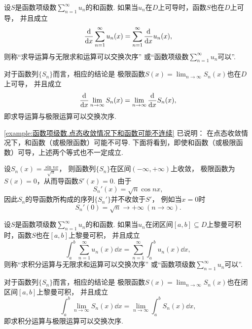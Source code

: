 \begin{definition}
设\(S\)是函数项级数\(\sum_{n=1}^\infty u_n\)的和函数.
如果当\(u_n\)在\(D\)上可导时，函数\(S\)也在\(D\)上可导，
并且成立\begin{equation*}
	\dv{x} \sum_{n=1}^\infty u_n(x)
	= \sum_{n=1}^\infty \dv{x} u_n(x),
\end{equation*}
则称“求导运算与无限求和运算可以交换次序”
或“函数项级数\(\sum_{n=1}^\infty u_n\)可以”.
\end{definition}
对于函数列\(\{S_n\}\)而言，相应的结论是
极限函数\(S(x) = \lim_{n\to\infty} S_n(x)\)也在\(D\)上可导，
并且成立\begin{equation*}
	\dv{x} \lim_{n\to\infty} S_n(x)
	= \lim_{n\to\infty} \dv{x} S_n(x),
\end{equation*}
即求导运算与极限运算可以交换次序.

\cref{example:函数项级数.点态收敛情况下和函数可能不连续} 已说明：
在点态收敛情况下，和函数（或极限函数）可能不可导.
下面将看到，即使和函数（或极限函数）可导，上述两个等式也不一定成立.
\begin{example}
设\(S_n(x) = \frac{\sin nx}{\sqrt{n}}\)，
则函数列\(\{S_n\}\)在区间\((-\infty,+\infty)\)上收敛，
极限函数为\(S(x) = 0\)，从而导函数\(S'(x) = 0\).
由于\begin{equation*}
	S_n'(x) = \sqrt{n} \cos nx,
\end{equation*}
因此\(S_n\)的导函数所构成的序列\(\{S_n'\}\)并不收敛于\(S'\)，
例如当\(x=0\)时\begin{equation*}
	S_n'(0) = \sqrt{n}\to+\infty\ (n\to\infty).
\end{equation*}
\end{example}

\begin{definition}
设\(S\)是函数项级数\(\sum_{n=1}^\infty u_n\)的和函数.
如果当\(u_n\)在闭区间\([a,b] \subseteq D\)上黎曼可积时，函数\(S\)也在\([a,b]\)上黎曼可积，
并且成立\begin{equation*}
	\int_a^b \sum_{n=1}^\infty u_n(x) \dd{x}
	= \sum_{n=1}^\infty \int_a^b u_n(x) \dd{x},
\end{equation*}
则称“求积分运算与无限求和运算可以交换次序”
或“函数项级数\(\sum_{n=1}^\infty u_n\)可以”.
\end{definition}
对于函数列\(\{S_n\}\)而言，相应的结论是
极限函数\(S(x) = \lim_{n\to\infty} S_n(x)\)也在闭区间\([a,b]\)上黎曼可积，
并且成立\begin{equation*}
	\int_a^b \lim_{n\to\infty} S_n(x) \dd{x}
	= \lim_{n\to\infty} \int_a^b S_n(x) \dd{x},
\end{equation*}
即求积分运算与极限运算可以交换次序.

